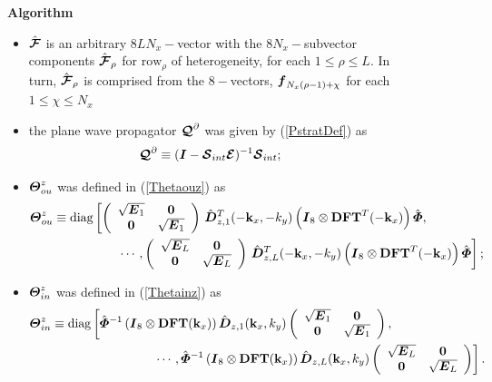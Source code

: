\begin{figure}
{\begin{minipage} {140.0mm} {\bf  Algorithm}
\begin{itemize}
\item $\hat{\mbox{\boldmath$\cal F$\unboldmath}}$ is an arbitrary $8 L N_x-$vector with the $8 
N_x-$subvector components $\hat{\mbox{\boldmath$\cal F$\unboldmath}}_{\rho}$ for $\mbox{row}_{\rho}$ of 
heterogeneity, for each   $1 \le \rho \le L$.
In turn, $\hat{\mbox{\boldmath$\cal F$\unboldmath}}_{\rho}$ is  comprised from the $8-$vectors, 
${\mbox{\boldmath$\mit f$\unboldmath}}_{N_x(\rho-1)+\chi}$ for each  $1  \le \chi \le N_x$
 
\item the plane wave propagator ${\mbox{\boldmath$\cal Q$\unboldmath}}^{\partial}$ was given by (\ref{PstratDef}) as
\[
{\mbox{\boldmath$\cal Q$\unboldmath}}^{\partial}\equiv 
({\mbox{\boldmath$\mit I$\unboldmath}}-{\mbox{\boldmath$\cal S$\unboldmath}}_{{int}}{\mbox{\boldmath$\cal E$\unboldmath}})^{-1}{\mbox{\boldmath$\cal S$\unboldmath}}_{{int}};
\]

\item ${\mbox{\boldmath$\mit \Theta$\unboldmath}}^{z}_{ou}$ was defined in (\ref{Thetaouz}) as
\begin{eqnarray*}
\lefteqn{{\bmi \Theta}^{z}_{ou}\equiv
\mbox{diag}\left[
\left({\begin{array}{cc}
\sqrt{{\bmi E}_{1}}&{\bf 0}\\ 
{\bf 0}&\sqrt{{\bmi E}_{1}}
\end{array}}\right)\,\hat{\bmi  D}{}^{T}_{z,1}(-{\bf k}_{x},-{k}_{y})\left({\bmi I}_8\otimes
{\bf DFT}^{T}(-{\bf k}_{x})  \right)\hat{\bmi \Phi} ,\right.}\\
&& \hspace{6em}
\left. \cdots,
\left({\begin{array}{cc}
\sqrt{{\bmi E}_{L}}&{\bf 0}\\ 
{\bf 0}&\sqrt{{\bmi E}_{L}}
\end{array}}\right)\,\hat{\bmi  D}{}^{T}_{z,L}(-{\bf k}_{x},-{k}_{y})\left({\bmi I}_8\otimes
{\bf DFT}^{T}(-{\bf k}_{x})  \right)\hat{\bmi \Phi}   
\right];
\end{eqnarray*}

\item ${\mbox{\boldmath$\mit \Theta$\unboldmath}}^{z}_{in}$ was defined in (\ref{Thetainz}) as
\begin{eqnarray*}
\lefteqn{{\bmi \Theta}^{z}_{in}\equiv
\mbox{diag}\left[
\hat{\bmi \Phi}{}^{-1}\left({\bmi I}_8\otimes 
{\bf DFT}({\bf k}_{x}) \right)\hat{\bmi  D}_{z,1}({\bf k}_{x},{k}_{y})
\left({\begin{array}{cc}
\sqrt{{\bmi E}_{1}}&{\bf 0}\\ 
{\bf 0}&\sqrt{{\bmi E}_{1}}
\end{array}}\right),\right.}\\
&&\hspace{9em}
\left. \cdots,
\hat{\bmi \Phi}{}^{-1}\left({\bmi I}_8\otimes 
{\bf DFT}({\bf k}_{x}) \right)\hat{\bmi  D}_{z,L}({\bf k}_{x},{k}_{y})
\left({\begin{array}{cc}
\sqrt{{\bmi E}_{L}}&{\bf 0}\\ 
{\bf 0}&\sqrt{{\bmi E}_{L}}
\end{array}}\right)
\right].
\end{eqnarray*}


\end{itemize}
\end{minipage}}
\end{figure}
